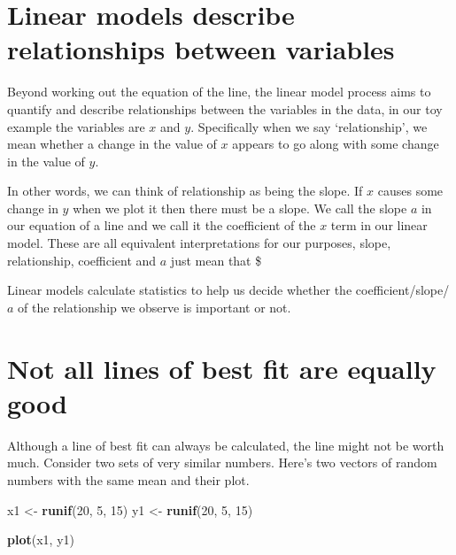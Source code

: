 \documentclass[]{book}
\newenvironment{Shaded}{\begin{snugshade}}{\end{snugshade}}
\newcommand{\DecValTok}[1]{\textcolor[rgb]{0.00,0.00,0.81}{#1}}
\newcommand{\KeywordTok}[1]{\textcolor[rgb]{0.13,0.29,0.53}{\textbf{#1}}}
\newcommand{\NormalTok}[1]{#1}
\newcommand{\StringTok}[1]{\textcolor[rgb]{0.31,0.60,0.02}{#1}}
\begin{document}
\hypertarget{linear-models-describe-relationships-between-variables}{%
\section{Linear models describe relationships between variables}\label{linear-models-describe-relationships-between-variables}}

Beyond working out the equation of the line, the linear model process aims to quantify and describe relationships between the variables in the data, in our toy example the variables are \(x\) and \(y\). Specifically when we say `relationship', we mean whether a change in the value of \(x\) appears to go along with some change in the value of \(y\).

In other words, we can think of relationship as being the slope. If \(x\) causes some change in \(y\) when we plot it then there must be a slope. We call the slope \(a\) in our equation of a line and we call it the coefficient of the \(x\) term in our linear model. These are all equivalent interpretations for our purposes, slope, relationship, coefficient and \(a\) just mean that \$

Linear models calculate statistics to help us decide whether the coefficient/slope/\(a\) of the relationship we observe is important or not.

\hypertarget{not-all-lines-of-best-fit-are-equally-good}{%
\section{Not all lines of best fit are equally good}\label{not-all-lines-of-best-fit-are-equally-good}}

Although a line of best fit can always be calculated, the line might not be worth much. Consider two sets of very similar numbers. Here's two vectors of random numbers with the same mean and their plot.

\begin{Shaded}
\begin{Highlighting}[]
\NormalTok{x1 <-}\StringTok{ }\KeywordTok{runif}\NormalTok{(}\DecValTok{20}\NormalTok{, }\DecValTok{5}\NormalTok{, }\DecValTok{15}\NormalTok{)}
\NormalTok{y1 <-}\StringTok{ }\KeywordTok{runif}\NormalTok{(}\DecValTok{20}\NormalTok{, }\DecValTok{5}\NormalTok{, }\DecValTok{15}\NormalTok{)}

\KeywordTok{plot}\NormalTok{(x1, y1)}
\end{Highlighting}
\end{Shaded}
\end{document}
